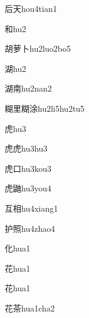 \begin{verbete}[6;4]{后天}{hou4tian1}
\end{verbete}
\begin{verbete}[8]{和}{hu2}
\end{verbete}
\begin{verbete}[9;11;2]{胡萝卜}{hu2luo2bo5}
\end{verbete}
\begin{verbete}[12]{湖}{hu2}
\end{verbete}
\begin{verbete*}[12;9]{湖南}{hu2nan2}
\end{verbete*}
\begin{verbete}[15;7;15;10]{糊里糊涂}{hu2li5hu2tu5}
\end{verbete}
\begin{verbete}[8]{虎}{hu3}
\end{verbete}
\begin{verbete}[8;8]{虎虎}{hu3hu3}
\end{verbete}
\begin{verbete}[8;3]{虎口}{hu3kou3}
\end{verbete}
\begin{verbete}[8;18]{虎鼬}{hu3you4}
\end{verbete}
\begin{verbete}[4;9]{互相}{hu4xiang1}
\end{verbete}
\begin{verbete}[7;13]{护照}{hu4zhao4}
\end{verbete}
\begin{verbete}[4]{化}{hua1}
\end{verbete}
\begin{verbete}[7]{花}{hua1}
\end{verbete}
\begin{verbete*}[7]{花}{hua1}
\end{verbete*}
\begin{verbete}[7;9]{花茶}{hua1cha2}
\end{verbete}
